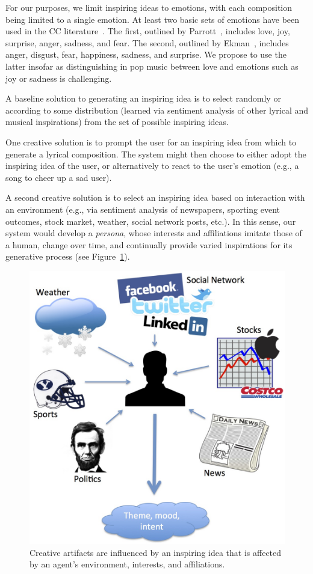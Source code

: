 \documentclass[11pt,phd]{byuprop}
\begin{document}
For our purposes, we limit inspiring ideas to emotions, with each composition being limited to a single emotion. At least two basic sets of emotions have been used in the CC literature~\cite{monteith2010automatic,mihalcea2012lyrics}. The first, outlined by Parrott~\cite{parrott2001emotions}, includes love, joy, surprise, anger, sadness, and fear. The second, outlined by Ekman~\cite{ekman1993facial}, includes anger, disgust, fear, happiness, sadness, and surprise. We propose to use the latter insofar as distinguishing in pop music between love and emotions such as joy or sadness is challenging.

A baseline solution to generating an inspiring idea is to select randomly or according to some distribution (learned via sentiment analysis of other lyrical and musical inspirations) from the set of possible inspiring ideas. 

One creative solution is to prompt the user for an inspiring idea from which to generate a lyrical composition. The system might then choose to either adopt the inspiring idea of the user, or alternatively to react to the user's emotion (e.g., a song to cheer up a sad user). 

A second creative solution is to select an inspiring idea based on interaction with an environment (e.g., via sentiment analysis of newspapers, sporting event outcomes, stock market, weather, social network posts, etc.). In this sense, our system would develop a \emph{persona}, whose interests and affiliations imitate those of a human, change over time, and continually provide varied inspirations for its generative process (see Figure~\ref{fig:inspiring_idea}).

\begin{figure}
  \centering
  \includegraphics[width=.45\textwidth]{graphics/inspiring_idea.jpg}
  \caption{Creative artifacts are influenced by an inspiring idea that is affected by an agent's environment, interests, and affiliations.}
    \label{fig:inspiring_idea}
\end{figure}
\end{document}
